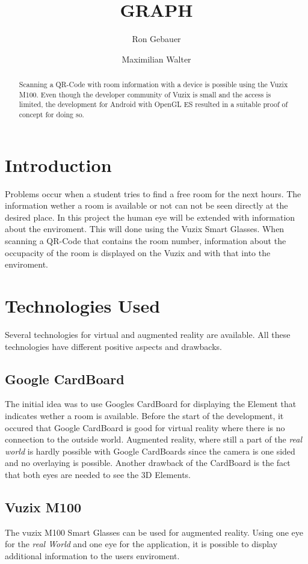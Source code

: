 \documentclass[]{article}
\title{GRAPH}
\author{Ron Gebauer \and Maximilian Walter}
\begin{document}
\maketitle

\begin{abstract}
Scanning a QR-Code with room information with a device is possible using the Vuzix M100. Even though the developer community of Vuzix is small and the access is limited, the development for Android with OpenGL ES resulted in a suitable proof of concept for doing so. 
\end{abstract}
\begin{multicols}{2}
\section{Introduction}
Problems occur when a student tries to find a free room for the next hours. The information wether a room is available or not can not be seen directly at the desired place. In this project the human eye will be extended with information about the enviroment. This will done using the Vuzix Smart Glasses. When scanning a QR-Code that contains the room number, information about the occupacity of the room is displayed on the Vuzix and with that into the enviroment. 
\section{Technologies Used}
Several technologies for virtual and augmented reality are available. All these technologies have different positive aspects and drawbacks.
\subsection{Google CardBoard}
The initial idea was to use Googles CardBoard for displaying the Element that indicates wether a room is available. Before the start of the development, it occured that Google CardBoard is good for virtual reality where there is no connection to the outside world. Augmented reality, where still a part of the \emph{real world} is hardly possible with Google CardBoards since the camera is one sided and no overlaying is possible.
\newline
Another drawback of the CardBoard is the fact that both eyes are needed to see the 3D Elements.   
\subsection{Vuzix M100}
The vuzix M100 Smart Glasses can be used for augmented reality. Using one eye for the \emph{real World} and one eye for the application, it is possible to display additional information to the users enviroment.

\end{multicols}
\end{document}
